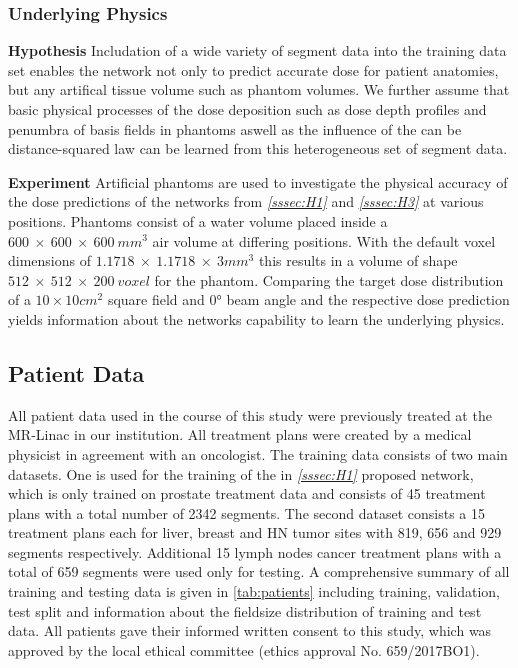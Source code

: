 \subsubsection{Underlying Physics}\label{sssec:H4}
\begin{hanginglist}\itemsep2pt

    \item\textbf{Hypothesis}\newline
    Includation of a wide variety of segment data into the training data set enables the network not only to predict accurate dose for patient anatomies, but any artifical tissue volume such as phantom volumes. We further assume that basic physical processes of the dose deposition such as dose depth profiles and penumbra of basis fields in phantoms aswell as the influence of the can be distance-squared law can be learned from this heterogeneous set of segment data. 

    \item\textbf{Experiment}\newline
    Artificial phantoms are used to investigate the physical accuracy of the dose predictions of the networks from \emph{\ref{sssec:H1} } and \emph{\ref{sssec:H3} } at various positions. Phantoms consist of a water volume placed inside a $600~\times~600~\times~600~mm^3$ air volume at differing positions. With the default voxel dimensions of $1.1718~\times~1.1718~\times~3mm^3$ this results in a volume of shape $512~\times~512~\times~200~voxel$ for the phantom. Comparing the target dose distribution of a $10 \times 10 cm^2$ square field and 0° beam angle  and the respective dose prediction yields information about the networks capability to learn the underlying physics.

\end{hanginglist}

\subsection{Patient Data}

All patient data used in the course of this study were previously treated at the MR-Linac in our institution. 
All treatment plans were created by a medical physicist in agreement with an oncologist. The training data consists of two main datasets. 
One is used for the training of the in \emph{\ref{sssec:H1} } proposed network, which is only trained on prostate treatment data and consists of 45 treatment plans with a total number of 2342 segments. 
The second dataset consists a 15 treatment plans each for liver, breast and \acs{HN} tumor sites with 819, 656 and 929 segments respectively. 
Additional 15 lymph nodes cancer treatment plans with a total of 659 segments were used only for testing. 
A comprehensive summary of all training and testing data is given in \autoref{tab:patients} including training, validation, test split and information about the fieldsize distribution of training and test data. 
All patients gave their informed written consent to this study, which was approved by the local ethical committee (ethics approval No. 659/2017BO1).


